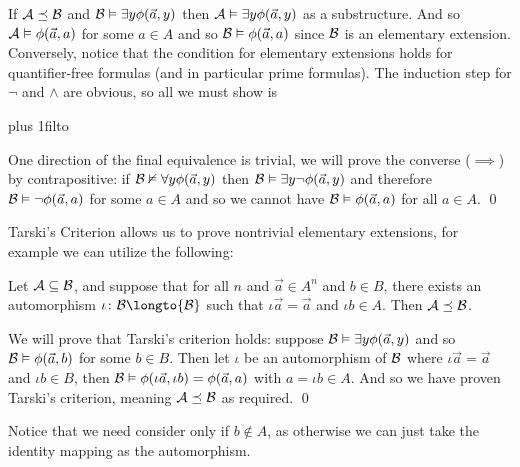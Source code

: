 \ethrm

If ${\cal A}\preceq{\cal B}$ and ${\cal B}\vDash\exists y\phi(\vec a,y)$ then ${\cal A}\vDash\exists y\phi(\vec a,y)$ as a substructure.
And so ${\cal A}\vDash\phi(\vec a,a)$ for some $a\in A$ and so ${\cal B}\vDash\phi(\vec a,a)$ since ${\cal B}$ is an elementary extension.
Conversely, notice that the condition for elementary extensions holds for quantifier-free formulas (and in particular prime formulas).
The induction step for $\neg$ and $\land$ are obvious, so all we must show is

\medskip
{\tabskip=0pt plus 1fil\jot\halign to}
\medskip

One direction of the final equivalence is trivial, we will prove the converse ($\implies$) by contrapositive: if ${\cal B}\nvDash\forall y\phi(\vec a,y)$ then
${\cal B}\vDash\exists y\neg\phi(\vec a,y)$ and therefore ${\cal B}\vDash\neg\phi(\vec a,a)$ for some $a\in A$ and so we cannot have ${\cal B}\vDash\phi(\vec a,a)$ for all $a\in A$.
\qed

Tarski's Criterion allows us to prove nontrivial elementary extensions, for example we can utilize the following:

\bthrm

    Let ${\cal A}\subseteq{\cal B}$, and suppose that for all $n$ and $\vec a\in A^n$ and $b\in B$, there exists an automorphism $\iota\colon{\cal B}\longto{\cal B}$ such that $\iota\vec a=\vec a$
    and $\iota b\in A$.
    Then ${\cal A}\preceq{\cal B}$.

\ethrm

We will prove that Tarski's criterion holds: suppose ${\cal B}\vDash\exists y\phi(\vec a,y)$ and so ${\cal B}\vDash\phi(\vec a,b)$ for some $b\in B$.
Then let $\iota$ be an automorphism of ${\cal B}$ where $\iota\vec a=\vec a$ and $\iota b\in B$, then ${\cal B}\vDash\phi(\iota\vec a,\iota b)=\phi(\vec a,a)$ with $a=\iota b\in A$.
And so we have proven Tarski's criterion, meaning ${\cal A}\preceq{\cal B}$ as required.
\qed

Notice that we need consider only if $b\notin A$, as otherwise we can just take the identity mapping as the automorphism.

\bexam

